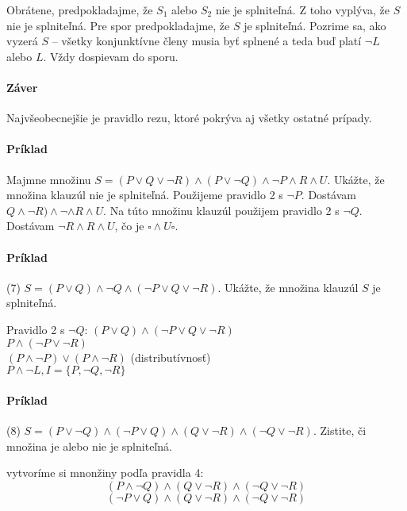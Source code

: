 \begin{enumerate}
	\par Obrátene, predpokladajme, že $S_1$ alebo $S_2$ nie je splniteľná. Z
	toho vyplýva, že $S$ nie je splniteľná. Pre spor predpokladajme, že $S$
	je splniteľná. Pozrime sa, ako vyzerá $S$ -- všetky konjunktívne členy
	musia byť splnené a teda buď platí $\neg L$ alebo $L$. Vždy dospievam do
	sporu.
\end{enumerate}

\paragraph{Záver} Najvšeobecnejšie je pravidlo rezu, ktoré pokrýva aj všetky
ostatné prípady.

\paragraph{Príklad} Majmne množinu $S=(P \lor Q \lor \neg R) \land (P \lor \neg
Q) \land \neg P \land R \land U$. Ukážte, že množina klauzúl nie je splniteľná.
Použijeme pravidlo 2 s $\neg P$. Dostávam $Q\land\neg R) \land \neg  \land R
\land U$. Na túto množinu klauzúl použijem pravidlo 2 s $\neg Q$. Dostávam $\neg
R \land R \land U$, čo je $\square \land U \square$.




\paragraph{Príklad} (7) $S=(P \lor Q) \land \neg Q \land ( \neg P \lor Q \lor \neg
R)$. Ukážte, že množina klauzúl $S$ je splniteľná.
\par Pravidlo 2 s $\neg Q$: $(P \lor Q) \land ( \neg P \lor Q \lor \neg R)$ \\
$P \land (\neg P \lor \neg R)$ \\
$(P \land \neg P) \lor (P \land \neg R)$ (distributívnosť) \\
$P \land \neg L, I=\{P,\neg Q, \neg R\}$

\paragraph{Príklad} (8) $S=(P\lor \neg Q) \land (\neg P \lor Q) \land (Q \lor
\neg R) \land (\neg Q \lor \neg R)$. Zistite, či množina je alebo nie je
splniteľná.
\par vytvoríme si mnonžiny podľa pravidla 4: \\
$$(P\land \neg Q) \land (Q \lor \neg R)  \land (\neg Q \lor \neg R)$$
$$(\neg P \lor Q) \land (Q \lor \neg R) \land (\neg Q \lor \neg R)$$

